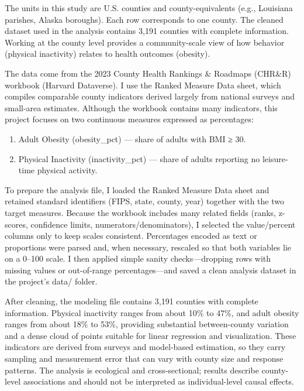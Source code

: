 \documentclass[
  letterpaper,
  DIV=11,
  numbers=noendperiod]{scrartcl}
\begin{document}
The units in this study are U.S. counties and county-equivalents (e.g.,
Louisiana parishes, Alaska boroughs). Each row corresponds to one
county. The cleaned dataset used in the analysis contains 3,191 counties
with complete information. Working at the county level provides a
community-scale view of how behavior (physical inactivity) relates to
health outcomes (obesity).

The data come from the 2023 County Health Rankings \& Roadmaps (CHR\&R)
workbook (Harvard Dataverse). I use the Ranked Measure Data sheet, which
compiles comparable county indicators derived largely from national
surveys and small-area estimates. Although the workbook contains many
indicators, this project focuses on two continuous measures expressed as
percentages:

\begin{enumerate}
\def\labelenumi{\arabic{enumi}.}
\item
  Adult Obesity (obesity\_pct) --- share of adults with BMI ≥ 30.
\item
  Physical Inactivity (inactivity\_pct) --- share of adults reporting no
  leisure-time physical activity.
\end{enumerate}

To prepare the analysis file, I loaded the Ranked Measure Data sheet and
retained standard identifiers (FIPS, state, county, year) together with
the two target measures. Because the workbook includes many related
fields (ranks, z-scores, confidence limits, numerators/denominators), I
selected the value/percent columns only to keep scales consistent.
Percentages encoded as text or proportions were parsed and, when
necessary, rescaled so that both variables lie on a 0--100 scale. I then
applied simple sanity checks---dropping rows with missing values or
out-of-range percentages---and saved a clean analysis dataset in the
project's data/ folder.

After cleaning, the modeling file contains 3,191 counties with complete
information. Physical inactivity ranges from about 10\% to 47\%, and
adult obesity ranges from about 18\% to 53\%, providing substantial
between-county variation and a dense cloud of points suitable for linear
regression and visualization. These indicators are derived from surveys
and model-based estimation, so they carry sampling and measurement error
that can vary with county size and response patterns. The analysis is
ecological and cross-sectional; results describe county-level
associations and should not be interpreted as individual-level causal
effects.
\end{document}
